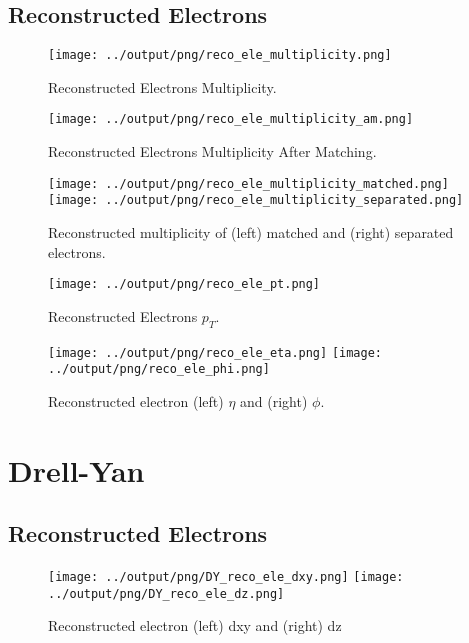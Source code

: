 \documentclass[11pt]{book}
\begin{document}
\section{Reconstructed Electrons}

\begin{figure}[ht]
\centering
\texttt{[image: ../output/png/reco\_ele\_multiplicity.png]}
\caption{Reconstructed Electrons Multiplicity.}
\label{fig:reco_ele_multiplicity}
\end{figure}

\begin{figure}[ht]
\centering
\texttt{[image: ../output/png/reco\_ele\_multiplicity\_am.png]}
\caption{Reconstructed Electrons Multiplicity After Matching.}
\label{fig:reco_ele_multiplicity_am}
\end{figure}

\begin{figure}[ht]
\centering
\texttt{[image: ../output/png/reco\_ele\_multiplicity\_matched.png]}
\texttt{[image: ../output/png/reco\_ele\_multiplicity\_separated.png]}
\caption{Reconstructed multiplicity of (left) matched and (right) separated electrons.}
\label{fig:reco_ele_mat_sep}
\end{figure}

\begin{figure}[ht]
\centering
\texttt{[image: ../output/png/reco\_ele\_pt.png]}
\caption{Reconstructed Electrons $p_{T}$.}
\label{fig:reco_ele_pt}
\end{figure}

\begin{figure}[ht]
\centering
\texttt{[image: ../output/png/reco\_ele\_eta.png]}
\texttt{[image: ../output/png/reco\_ele\_phi.png]}
\caption{Reconstructed electron (left) $\eta$ and (right) $\phi$.}
\label{fig:reco_ele_eta_phi}
\end{figure}

\clearpage

\chapter{Drell-Yan}
\section{Reconstructed Electrons}
\begin{figure}[ht]
\centering
\texttt{[image: ../output/png/DY\_reco\_ele\_dxy.png]}
\texttt{[image: ../output/png/DY\_reco\_ele\_dz.png]}
\caption{Reconstructed electron (left) dxy and (right) dz}
\label{fig:dy_reco_ele_dxy_dz}
\end{figure}
\end{document}
